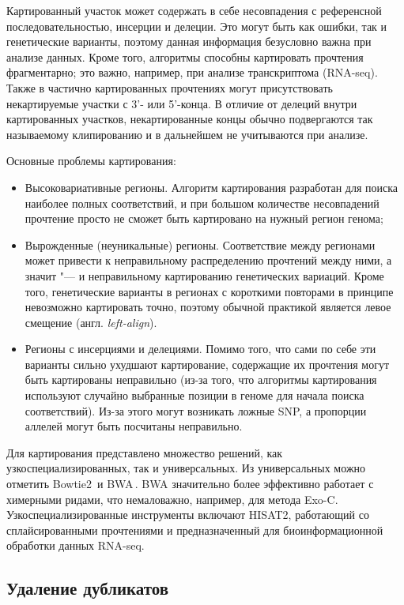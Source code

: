 \documentclass[12pt, twoside, a4paper]{article}
\newcommand{\utilname}[1]{\textenglish{#1}}
\newcommand{\engterm}[1]{англ. \textenglish{\textit{#1}}}
\begin{document}
Картированный участок может содержать в себе несовпадения с референсной последовательностью, инсерции и делеции.
Это могут быть как ошибки, так и генетические варианты, поэтому данная информация безусловно важна при анализе данных.
Кроме того, алгоритмы способны картировать прочтения фрагментарно;
это важно, например, при анализе транскриптома (RNA-seq).
Также в частично картированных прочтениях могут присутствовать некартируемые участки с 3'- или 5'-конца.
В отличие от делеций внутри картированных участков, некартированные концы обычно подвергаются так называемому клипированию и в дальнейшем не учитываются при анализе.

Основные проблемы картирования:

\begin{itemize}
	\item Высоковариативные регионы.
	      Алгоритм картирования разработан для поиска наиболее полных соответствий, и при большом количестве несовпадений прочтение просто не сможет быть картировано на нужный регион генома;
	\item Вырожденные (неуникальные) регионы.
	      Соответствие между регионами может привести к неправильному распределению прочтений между ними, а значит "--- и неправильному картированию генетических вариаций.
	      Кроме того, генетические варианты в регионах с короткими повторами в принципе невозможно картировать точно, поэтому обычной практикой является левое смещение (\engterm{left-align}).
	\item Регионы с инсерциями и делециями.
	      Помимо того, что сами по себе эти варианты сильно ухудшают картирование, содержащие их прочтения могут быть картированы неправильно (из-за того, что алгоритмы картирования используют случайно выбранные позиции в геноме для начала поиска соответствий).
	      Из-за этого могут возникать ложные SNP, а пропорции аллелей могут быть посчитаны неправильно.
\end{itemize}

Для картирования представлено множество решений, как узкоспециализированных, так и универсальных.
Из универсальных можно отметить \utilname{Bowtie2}\,\citep{Langmead_2012} и \utilname{BWA}\,\citep{Li_2009}.
\utilname{BWA} значительно более эффективно работает с химерными ридами, что немаловажно, например, для метода Exo-C.
Узкоспециализированные инструменты включают HISAT2\cite{Kim_2015}, работающий со сплайсированными прочтениями и предназначенный для биоинформационной обработки данных RNA-seq.

\subsection*{Удаление дубликатов}
\end{document}
